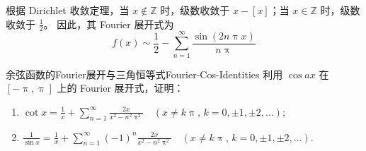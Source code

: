 \begin{solution}
    根据 Dirichlet 收敛定理，当 $x \notin \mathbb{Z}$ 时，级数收敛于 $x - [x]$；当 $x \in \mathbb{Z}$ 时，级数收敛于 $\frac{1}{2}$。
    因此，其 Fourier 展开式为
    \begin{equation}
        \boxed{f(x) \sim \frac{1}{2} - \sum_{n=1}^{\infty} \frac{\sin(2n\uppi x)}{n\uppi}}
    \end{equation}
\end{solution}

\begin{problem}{余弦函数的Fourier展开与三角恒等式}{Fourier-Cos-Identities}
    利用 $\cos ax$ 在 $[-\uppi, \uppi]$ 上的 Fourier 展开式，证明：
    \begin{enumerate}
        \item $\cot x = \frac{1}{x} + \sum_{n=1}^{\infty} \frac{2x}{x^2 - n^2 \uppi^2} \quad (x \neq k\uppi, \, k = 0, \pm 1, \pm 2, \dots)$;
        \item $\frac{1}{\sin x} = \frac{1}{x} + \sum_{n=1}^{\infty} (-1)^n \frac{2x}{x^2 - n^2 \uppi^2} \quad (x \neq k\uppi, \, k = 0, \pm 1, \pm 2, \dots)$.
    \end{enumerate}
\end{problem}

